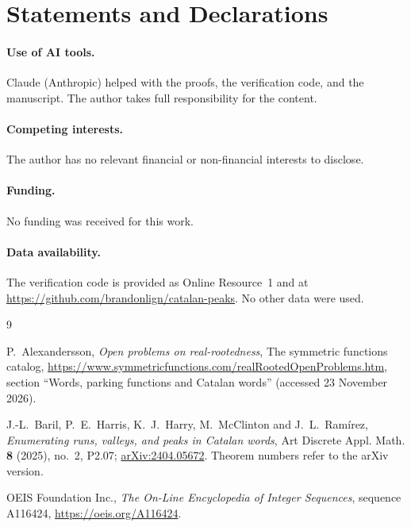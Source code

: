 \documentclass[11pt]{amsart}
\theoremstyle{remark}
\begin{document}
\section*{Statements and Declarations}

\paragraph{Use of AI tools.} Claude (Anthropic) helped with the proofs, the verification code, and the
manuscript. The author takes full responsibility for the content.

\paragraph{Competing interests.} The author has no relevant financial or non-financial
interests to disclose.

\paragraph{Funding.} No funding was received for this work.

\paragraph{Data availability.} The verification code is provided as Online
Resource~1 and at \url{https://github.com/brandonlign/catalan-peaks}. No other data
were used.

\begin{thebibliography}{9}

P.~Alexandersson, \emph{Open problems on real-rootedness}, The symmetric
functions catalog, \url{https://www.symmetricfunctions.com/realRootedOpenProblems.htm},
section ``Words, parking functions and Catalan words'' (accessed 23 November 2026).

J.-L.~Baril, P.~E.~Harris, K.~J.~Harry, M.~McClinton and J.~L.~Ram\'irez,
\emph{Enumerating runs, valleys, and peaks in Catalan words}, Art Discrete Appl.
Math. \textbf{8} (2025), no.~2, P2.07;
\href{https://arxiv.org/abs/2404.05672}{arXiv:2404.05672}. Theorem numbers
refer to the arXiv version.

OEIS Foundation Inc., \emph{The On-Line Encyclopedia of Integer Sequences},
sequence A116424, \url{https://oeis.org/A116424}.

\end{thebibliography}
\end{document}
